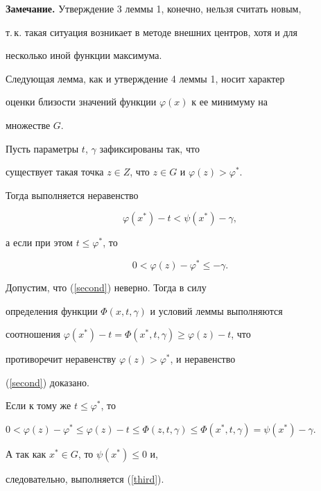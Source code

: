 {\bf Замечание.} Утверждение 3 леммы 1, конечно, нельзя считать новым,


т.\,к. такая ситуация возникает в методе внешних центров, хотя и для


несколько иной функции максимума.


\medskip





Следующая лемма, как и утверждение 4 леммы 1, носит характер


оценки близости значений функции $\varphi(x)$ к ее минимуму на


множестве $G$.





\begin{lem}


Пусть параметры $t$, $\gamma$ зафиксированы так, что


существует такая точка $z\in Z$, что $z\in G$ и $\varphi(z)>\varphi^*$.


Тогда выполняется неравенство


\begin{equation}


\label{second}


\varphi(x^*)-t<\psi(x^*)-\gamma,


\end{equation}


а если при этом $t\le\varphi^*$, то


\begin{equation}


\label{third}


0<\varphi(z)-\varphi^*\le-\gamma.


\end{equation}


\end{lem}





\begin{pf}


Допустим, что (\ref{second}) неверно. Тогда в силу


определения функции $\Phi(x,t,\gamma)$ и условий леммы выполняются


соотношения $ \varphi(x^*)-t=\Phi(x^*,t,\gamma)\ge\varphi(z)-t $, что


противоречит неравенству $\varphi(z)>\varphi^*$, и неравенство


(\ref{second}) доказано.





Если к тому же $t\le\varphi^*$, то


$0<\varphi(z)-\varphi^*\le\varphi(z)-t\le


\Phi(z,t,\gamma)\le\Phi(x^*,t,\gamma)=\psi(x^*)-\gamma$.


А так как $x^*\in G$, то $\psi(x^*)\le0$ и,


следовательно, выполняется (\ref{third}).


\end{pf}





